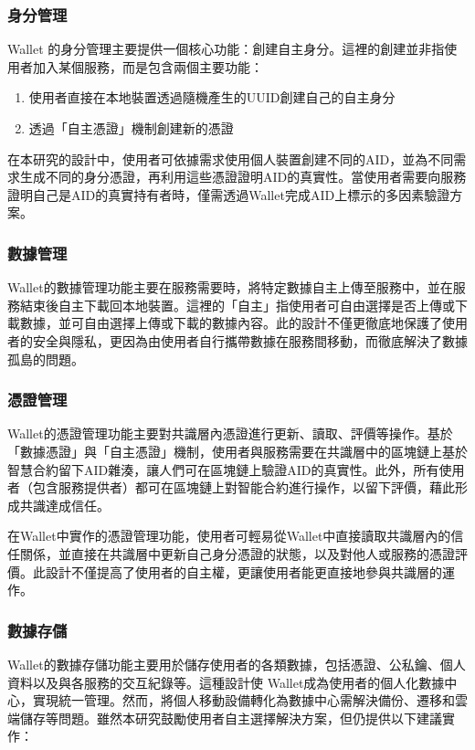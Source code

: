 \subsubsection{身分管理}
Wallet 的身分管理主要提供一個核心功能：創建自主身分。這裡的創建並非指使用者加入某個服務，而是包含兩個主要功能：
\begin{enumerate}
  \item 使用者直接在本地裝置透過隨機產生的UUID創建自己的自主身分
  \item 透過「自主憑證」機制創建新的憑證
\end{enumerate}
在本研究的設計中，使用者可依據需求使用個人裝置創建不同的AID，並為不同需求生成不同的身分憑證，再利用這些憑證證明AID的真實性。當使用者需要向服務證明自己是AID的真實持有者時，僅需透過Wallet完成AID上標示的多因素驗證方案。
\subsubsection{數據管理}
Wallet的數據管理功能主要在服務需要時，將特定數據自主上傳至服務中，並在服務結束後自主下載回本地裝置。這裡的「自主」指使用者可自由選擇是否上傳或下載數據，並可自由選擇上傳或下載的數據內容。此的設計不僅更徹底地保護了使用者的安全與隱私，更因為由使用者自行攜帶數據在服務間移動，而徹底解決了數據孤島的問題。
\subsubsection{憑證管理}
Wallet的憑證管理功能主要對共識層內憑證進行更新、讀取、評價等操作。基於「數據憑證」與「自主憑證」機制，使用者與服務需要在共識層中的區塊鏈上基於智慧合約留下AID雜湊，讓人們可在區塊鏈上驗證AID的真實性。此外，所有使用者（包含服務提供者）都可在區塊鏈上對智能合約進行操作，以留下評價，藉此形成共識達成信任。

在Wallet中實作的憑證管理功能，使用者可輕易從Wallet中直接讀取共識層內的信任關係，並直接在共識層中更新自己身分憑證的狀態，以及對他人或服務的憑證評價。此設計不僅提高了使用者的自主權，更讓使用者能更直接地參與共識層的運作。
\subsubsection{數據存儲}
Wallet的數據存儲功能主要用於儲存使用者的各類數據，包括憑證、公私鑰、個人資料以及與各服務的交互紀錄等。這種設計使 Wallet成為使用者的個人化數據中心，實現統一管理。然而，將個人移動設備轉化為數據中心需解決備份、遷移和雲端儲存等問題。雖然本研究鼓勵使用者自主選擇解決方案，但仍提供以下建議實作：


